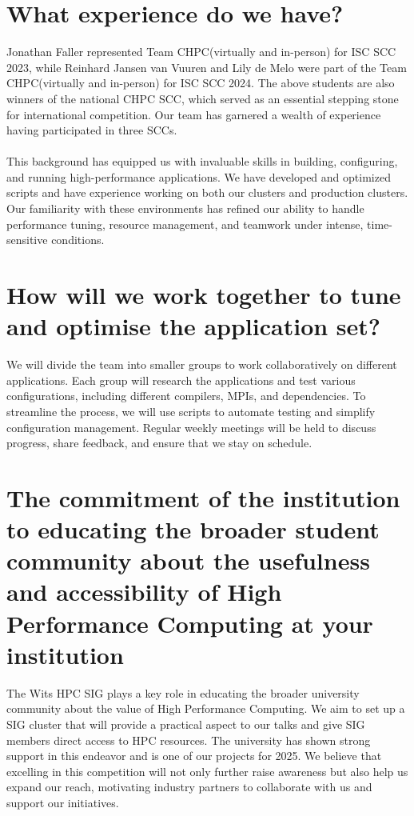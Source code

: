 \documentclass[10pt, onecolumn]{IEEEtran}
\begin{document}
\section{What experience do we have?}
\noindent
Jonathan Faller represented Team CHPC(virtually and in-person) for ISC SCC 2023, while Reinhard Jansen van Vuuren and Lily de Melo were part of the Team CHPC(virtually and in-person) for ISC SCC 2024. The above students are also winners of the national CHPC SCC, which served as an essential stepping stone for international competition. Our team has garnered a wealth of experience having participated in three SCCs. 
\\\\
This background has equipped us with invaluable skills in building, configuring, and running high-performance applications. We have developed and optimized scripts and have experience working on both our clusters and production clusters. Our familiarity with these environments has refined our ability to handle performance tuning, resource management, and teamwork under intense, time-sensitive conditions. 
\section{How will we work together to tune and optimise the application set?}
\noindent
We will divide the team into smaller groups to work collaboratively on different applications. Each group will research the applications and test various configurations, including different compilers, MPIs, and dependencies. To streamline the process, we will use scripts to automate testing and simplify configuration management. Regular weekly meetings will be held to discuss progress, share feedback, and ensure that we stay on schedule.
\section{The commitment of the institution to educating the broader student community about the usefulness and accessibility of High Performance Computing at your institution}
\noindent
The Wits HPC SIG plays a key role in educating the broader university community about the value of High Performance Computing. We aim to set up a SIG cluster that will provide a practical aspect to our talks and give SIG members direct access to HPC resources. The university has shown strong support in this endeavor and is one of our projects for 2025. We believe that excelling in this competition will not only further raise awareness but also help us expand our reach, motivating industry partners to collaborate with us and support our initiatives.
\end{document}
